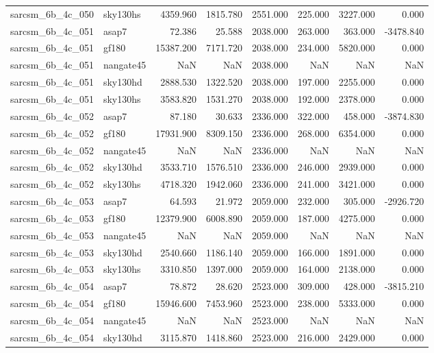 \begin{tabular}{llrrrrrr}
sarcsm\_6b\_4c\_050 & sky130hs & 4359.960 & 1815.780 & 2551.000 & 225.000 & 3227.000 & 0.000 \\
sarcsm\_6b\_4c\_051 & asap7 & 72.386 & 25.588 & 2038.000 & 263.000 & 363.000 & -3478.840 \\
sarcsm\_6b\_4c\_051 & gf180 & 15387.200 & 7171.720 & 2038.000 & 234.000 & 5820.000 & 0.000 \\
sarcsm\_6b\_4c\_051 & nangate45 & NaN & NaN & 2038.000 & NaN & NaN & NaN \\
sarcsm\_6b\_4c\_051 & sky130hd & 2888.530 & 1322.520 & 2038.000 & 197.000 & 2255.000 & 0.000 \\
sarcsm\_6b\_4c\_051 & sky130hs & 3583.820 & 1531.270 & 2038.000 & 192.000 & 2378.000 & 0.000 \\
sarcsm\_6b\_4c\_052 & asap7 & 87.180 & 30.633 & 2336.000 & 322.000 & 458.000 & -3874.830 \\
sarcsm\_6b\_4c\_052 & gf180 & 17931.900 & 8309.150 & 2336.000 & 268.000 & 6354.000 & 0.000 \\
sarcsm\_6b\_4c\_052 & nangate45 & NaN & NaN & 2336.000 & NaN & NaN & NaN \\
sarcsm\_6b\_4c\_052 & sky130hd & 3533.710 & 1576.510 & 2336.000 & 246.000 & 2939.000 & 0.000 \\
sarcsm\_6b\_4c\_052 & sky130hs & 4718.320 & 1942.060 & 2336.000 & 241.000 & 3421.000 & 0.000 \\
sarcsm\_6b\_4c\_053 & asap7 & 64.593 & 21.972 & 2059.000 & 232.000 & 305.000 & -2926.720 \\
sarcsm\_6b\_4c\_053 & gf180 & 12379.900 & 6008.890 & 2059.000 & 187.000 & 4275.000 & 0.000 \\
sarcsm\_6b\_4c\_053 & nangate45 & NaN & NaN & 2059.000 & NaN & NaN & NaN \\
sarcsm\_6b\_4c\_053 & sky130hd & 2540.660 & 1186.140 & 2059.000 & 166.000 & 1891.000 & 0.000 \\
sarcsm\_6b\_4c\_053 & sky130hs & 3310.850 & 1397.000 & 2059.000 & 164.000 & 2138.000 & 0.000 \\
sarcsm\_6b\_4c\_054 & asap7 & 78.872 & 28.620 & 2523.000 & 309.000 & 428.000 & -3815.210 \\
sarcsm\_6b\_4c\_054 & gf180 & 15946.600 & 7453.960 & 2523.000 & 238.000 & 5333.000 & 0.000 \\
sarcsm\_6b\_4c\_054 & nangate45 & NaN & NaN & 2523.000 & NaN & NaN & NaN \\
sarcsm\_6b\_4c\_054 & sky130hd & 3115.870 & 1418.860 & 2523.000 & 216.000 & 2429.000 & 0.000 \\

\end{tabular}
